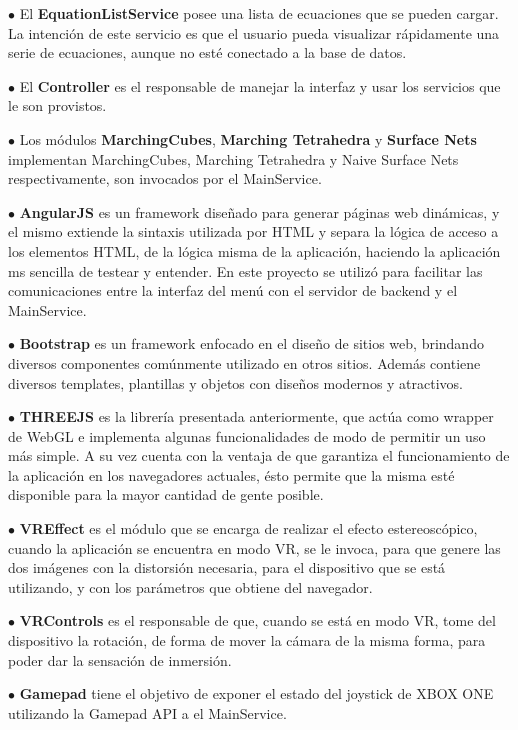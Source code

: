 \documentclass[12pt]{article}
\begin{document}
$\bullet$ El\textbf{ EquationListService} posee una lista de ecuaciones que se pueden cargar. La intención de este servicio es que el usuario pueda visualizar rápidamente una serie de ecuaciones, aunque no esté conectado a la base de datos.

$\bullet$ El \textbf{Controller} es el responsable de manejar la interfaz y usar los servicios que le son provistos.

$\bullet$ Los módulos \textbf{MarchingCubes}, \textbf{Marching Tetrahedra} y \textbf{Surface Nets} implementan MarchingCubes, Marching Tetrahedra y Naive Surface Nets respectivamente, son invocados por el MainService.

$\bullet$ \textbf{AngularJS} es un framework diseñado para generar páginas web dinámicas, y el mismo extiende la sintaxis utilizada por HTML y separa la lógica de acceso a los elementos HTML, de la lógica misma de la aplicación, haciendo la aplicación ms sencilla de testear y entender. En este proyecto se utilizó para facilitar las comunicaciones entre la interfaz del menú con el servidor de backend y el MainService.

$\bullet$ \textbf{Bootstrap} es un framework enfocado en el diseño de sitios web, brindando diversos componentes comúnmente utilizado en otros sitios. Además contiene diversos templates, plantillas y objetos con diseños modernos y atractivos. 

$\bullet$ \textbf{THREEJS} es la librería presentada anteriormente, que actúa como wrapper de WebGL e implementa algunas funcionalidades de modo de permitir un uso más simple. A su vez cuenta con la ventaja de que garantiza el funcionamiento de la aplicación en los navegadores actuales, ésto permite que la misma esté disponible para la mayor cantidad de gente posible.

$\bullet$ \textbf{VREffect} es el módulo que se encarga de realizar el efecto estereoscópico, cuando la aplicación se encuentra en modo VR, se le invoca, para que genere las dos imágenes con la distorsión necesaria, para el dispositivo que se está utilizando, y con los parámetros que obtiene del navegador.

$\bullet$ \textbf{VRControls} es el responsable de que, cuando se está en modo VR, tome del dispositivo la rotación, de forma de mover la cámara de la misma forma, para poder dar la sensación de inmersión.

$\bullet$ \textbf{Gamepad} tiene el objetivo de exponer el estado del joystick de XBOX ONE utilizando la Gamepad API\cite{gamepadapi} a el MainService.
\end{document}
